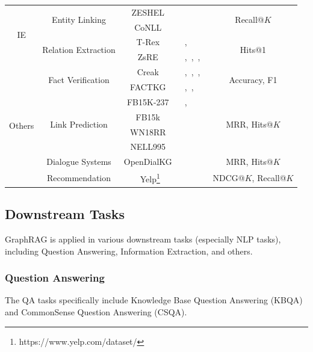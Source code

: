 \documentclass[acmsmall]{acmart}
\begin{document}
\begin{table}[htbp]
{\begin{tabular}{ccclc}
    \midrule
    \multirow{4}[1]{*}{IE} & \multirow{2}[0]{*}{Entity Linking} & ZESHEL~\cite{ref:zeshel} &  \cite{ref:ger}   & \multirow{2}[0]{*}{Recall@$K$} \\
          &       & CoNLL~\cite{ref:conll} & \cite{ref:ger}   &  \\
          & \multirow{2}[1]{*}{Relation Extraction} & T-Rex~\cite{ref:t-rex} & \cite{ref:oda},~\cite{ref:tog} & \multirow{2}[1]{*}{Hits@1} \\
          &       & ZsRE~\cite{ref:zsre}  & \cite{ref:noname6},~\cite{ref:oda},~\cite{ref:tog},~\cite{ref:tog2} &  \\
    \midrule
    \multirow{8}[2]{*}{Others} & \multirow{2}[0]{*}{Fact Verification} & Creak~\cite{ref:creak} & \cite{ref:noname6},~\cite{ref:oda},~\cite{ref:tog},~\cite{ref:tog2} & \multirow{2}[0]{*}{Accuracy, F1} \\
    &     & FACTKG~\cite{ref:factkg} &\cite{ref:kg-gpt},~\cite{ref:noname8},~\cite{ref:kelp} &  \\
          & \multirow{4}[0]{*}{Link Prediction} & FB15K-237~\cite{ref:fb15k-237} & \cite{ref:lark},~\cite{ref:kg-r3} & \multirow{4}[0]{*}{MRR, Hits@$K$} \\
          &       & FB15k~\cite{ref:fb15k} & \cite{ref:lark} &  \\
          &       & WN18RR~\cite{ref:wn} & \cite{ref:kg-r3} &  \\
          &       & NELL995~\cite{ref:nell} & \cite{ref:lark}  &  \\
          & Dialogue Systems & OpenDialKG~\cite{ref:opendialkg} & \cite{ref:difar} & MRR, Hits@$K$ \\
          & Recommendation & Yelp\footnote{https://www.yelp.com/dataset/} & \cite{ref:rete} & NDCG@$K$, Recall@$K$ \\
    \bottomrule
    \end{tabular}%
    }
  \label{tab:app}%
\end{table}%


\subsection{Downstream Tasks}
\label{sec:task}
GraphRAG is applied in various downstream tasks (especially NLP tasks), including Question Answering, Information Extraction, and others.

\subsubsection{Question Answering}
The QA tasks specifically include Knowledge Base Question Answering (KBQA) and CommonSense Question Answering (CSQA).
\end{document}
